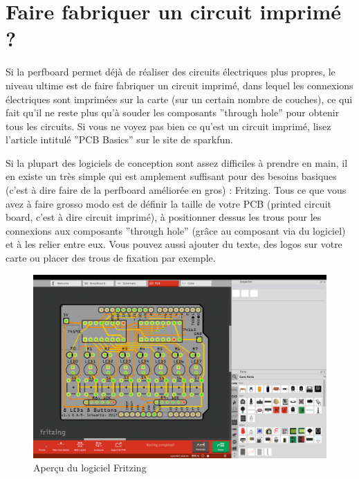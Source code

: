\documentclass[a4paper, 11pt]{report}
\begin{document}
\section{Faire fabriquer un circuit imprimé ?}

Si la perfboard permet déjà de réaliser des circuits électriques plus
propres, le niveau ultime est de faire fabriquer un circuit imprimé,
dans lequel les connexions électriques sont imprimées sur la carte
(sur un certain nombre de couches), ce qui fait qu'il ne reste plus
qu'à souder les composants ''through hole'' pour obtenir tous les
circuits. Si vous ne voyez pas bien ce qu'est un circuit imprimé,
lisez l'article intitulé ''PCB Basics'' sur le site de sparkfun.

Si la plupart des logiciels de conception sont assez difficiles à
prendre en main, il en existe un très simple qui est amplement suffisant
pour des besoins basiques (c'est à dire faire de la perfboard améliorée
en gros) : Fritzing. Tous ce que vous avez à faire grosso modo est
de définir la taille de votre PCB (printed circuit board, c'est à
dire circuit imprimé), à positionner dessus les trous pour les connexions
aux composants ''through hole'' (grâce au composant via du logiciel)
et à les relier entre eux. Vous pouvez aussi ajouter du texte, des
logos sur votre carte ou placer des trous de fixation par exemple.

\begin{figure}[h]
\caption{Aperçu du logiciel Fritzing}

\centering{}\includegraphics[width=1\textwidth]{images/fritzing}
\end{figure}
\end{document}
